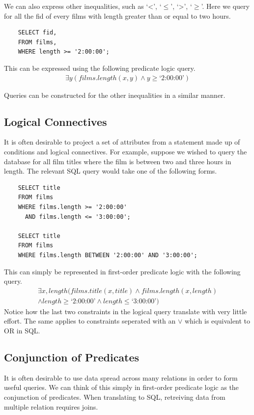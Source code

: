 \documentclass[a4paper, 11pt]{article}
\begin{document}
    We can also express other inequalities, such as `<', `$\le$', `>', `$\ge$'.
    Here we query for all the fid of every films with length greater than or
    equal to two hours.
    \begin{verbatim}
    SELECT fid,
    FROM films,
    WHERE length >= '2:00:00';
    \end{verbatim}
    This can be expressed using the following predicate logic query.
    \begin{gather}
      \exists y(films.length(x, y) \land y \ge \text{`2:00:00'}) \label{where5}
    \end{gather}

    Queries can be constructed for the other inequalities in a similar manner.

  \subsection{Logical Connectives}
    It is often desirable to project a set of attributes from a statement
    made up of conditions and logical connectives. For example, suppose we
    wished to query the database for all film titles where the film is between
    two and three hours in length. The relevant SQL query would take one of
    the following forms.
    \begin{verbatim}
    SELECT title
    FROM films
    WHERE films.length >= '2:00:00'
      AND films.length <= '3:00:00';

    SELECT title
    FROM films
    WHERE films.length BETWEEN '2:00:00' AND '3:00:00';
    \end{verbatim}
    This can simply be represented in first-order predicate logic with the
    following query.
    \begin{multline}
      \exists x, length(films.title(x, title) \land films.length(x,
      length)\\
      \land length \ge \text{`2:00:00'} \land length \le \text{`3:00:00'})
    \end{multline}
    Notice how the last two constraints in the logical query translate
    with very little effort. The same applies to constraints seperated with
    an $\lor$ which is equivalent to OR in SQL.

  \subsection{Conjunction of Predicates}
    \label{sec:joins}
    It is often desirable to use data spread across many relations in order to
    form useful queries. We can think of this simply in first-order predicate
    logic as the conjunction of predicates. When translating to SQL, retreiving
    data from multiple relation requires joins.
\end{document}
